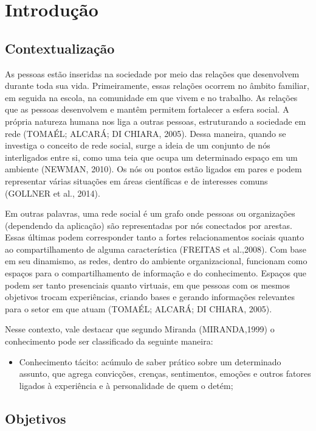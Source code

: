 \chapter{Introdução}
\section{Contextualizaç\~ao}

As pessoas estão inseridas na sociedade por meio das relações que desenvolvem durante toda sua vida. Primeiramente, essas relações ocorrem no âmbito familiar, em seguida na escola, na comunidade em que vivem e no trabalho. As relações que as pessoas desenvolvem e mantêm permitem fortalecer a esfera social. A própria natureza humana nos liga a outras pessoas, estruturando a sociedade em rede (TOMAÉL; ALCARÁ; DI CHIARA, 2005). Dessa maneira, quando se investiga o conceito de rede social, surge a ideia de um conjunto de nós interligados entre si, como uma teia que ocupa um determinado espaço em um ambiente (NEWMAN, 2010). Os nós ou pontos estão ligados em pares e podem representar várias situações em áreas científicas e de interesses comuns (GOLLNER et al., 2014).

Em outras palavras, uma rede social é um grafo onde pessoas ou organizações (dependendo da aplicação) são representadas por nós conectados por arestas. Essas últimas podem corresponder tanto a fortes relacionamentos sociais quanto ao compartilhamento de alguma característica (FREITAS et al.,2008). Com base em seu dinamismo, as redes, dentro do ambiente organizacional, funcionam como espaços para o compartilhamento de informação e do conhecimento. Espaços que podem ser tanto presenciais quanto virtuais, em que pessoas com os mesmos objetivos trocam experiências, criando bases e gerando informações relevantes para o setor em que atuam (TOMAÉL; ALCARÁ; DI CHIARA, 2005).

Nesse contexto, vale destacar que segundo Miranda (MIRANDA,1999) o conhecimento pode ser classificado da seguinte maneira:
	\begin{itemize}
	\item Conhecimento tácito:  acúmulo de saber prático sobre um determinado assunto, que agrega 			     convicções, crenças, sentimentos, emoções e outros fatores ligados à experiência e à personalidade        	 de quem o detém;
	\end{itemize}

\section{Objetivos}

